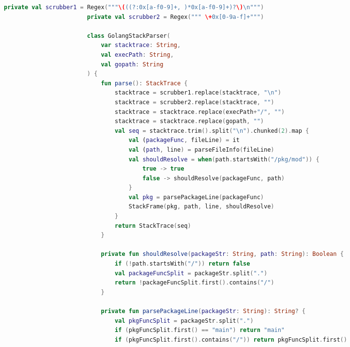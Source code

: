 \documentclass[12pt,pdftex,titlepage]{report}
\begin{document}
                \newpage
                \begin{spacing}{1.0}
                    \begin{lstlisting}[language=Kotlin, gobble=24, label={lst:goparser}, caption={The Go stack parser class with the various processing done to determine whether the filepath for a stack frame
                        will require additional user input to map to a local filepath.}]
                        private val scrubber1 = Regex("""\(((?:0x[a-f0-9]+, )*0x[a-f0-9]+)?\)\n""")
                        private val scrubber2 = Regex(""" \+0x[0-9a-f]+""")
                        
                        class GolangStackParser(
                            var stacktrace: String,
                            val execPath: String,
                            val gopath: String
                        ) {
                            fun parse(): StackTrace {
                                stacktrace = scrubber1.replace(stacktrace, "\n")
                                stacktrace = scrubber2.replace(stacktrace, "")
                                stacktrace = stacktrace.replace(execPath+"/", "")
                                stacktrace = stacktrace.replace(gopath, "")
                                val seq = stacktrace.trim().split("\n").chunked(2).map {
                                    val (packageFunc, fileLine) = it
                                    val (path, line) = parseFileInfo(fileLine) 
                                    val shouldResolve = when(path.startsWith("/pkg/mod")) {
                                        true -> true
                                        false -> shouldResolve(packageFunc, path)
                                    } 
                                    val pkg = parsePackageLine(packageFunc)
                                    StackFrame(pkg, path, line, shouldResolve)
                                }
                                return StackTrace(seq)
                            }
                        
                            private fun shouldResolve(packageStr: String, path: String): Boolean {
                                if (!path.startsWith("/")) return false
                                val packageFuncSplit = packageStr.split(".")
                                return !packageFuncSplit.first().contains("/")
                            }
                        
                            private fun parsePackageLine(packageStr: String): String? {
                                val pkgFuncSplit = packageStr.split(".")
                                if (pkgFuncSplit.first() == "main") return "main"
                                if (pkgFuncSplit.first().contains("/")) return pkgFuncSplit.first()


\end{lstlisting}
\end{spacing}
\end{document}
